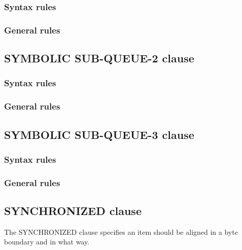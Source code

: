 \subsubsection{Syntax rules}

\subsubsection{General rules}

\subsection{SYMBOLIC SUB-QUEUE-2 clause}

\begin{syntax}[\deletedcolour]
\end{syntax}

\subsubsection{Syntax rules}

\subsubsection{General rules}

\subsection{SYMBOLIC SUB-QUEUE-3 clause}

\begin{syntax}[\deletedcolour]
\end{syntax}

\subsubsection{Syntax rules}

\subsubsection{General rules}

\subsection{SYNCHRONIZED clause}

The SYNCHRONIZED clause specifies an item should be aligned in a byte boundary and in what way.

